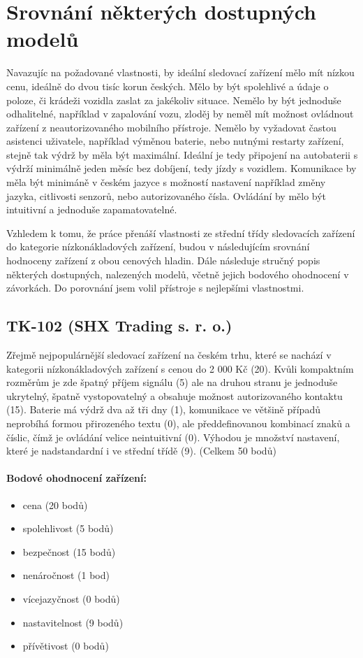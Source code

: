 \documentclass[FM,MP]{tulthesis}  %
\begin{document}
\section{Srovnání některých dostupných modelů}
Navazujíc na požadované vlastnosti, by ideální sledovací zařízení mělo mít nízkou cenu, ideálně do dvou tisíc korun českých. Mělo by být spolehlivé a údaje o poloze, či krádeži vozidla zaslat za jakékoliv situace. Nemělo by být jednoduše odhalitelné, například v zapalování vozu, zloděj by neměl mít možnost ovládnout zařízení z neautorizovaného mobilního přístroje. Nemělo by vyžadovat častou asistenci uživatele, například výměnou baterie, nebo nutnými restarty zařízení, stejně tak výdrž by měla být maximální. Ideální je tedy připojení na autobaterii s výdrží minimálně jeden měsíc bez dobíjení, tedy jízdy s vozidlem. Komunikace by měla být minimáně v českém jazyce s možností nastavení například změny jazyka, citlivosti senzorů, nebo autorizovaného čísla. Ovládání by mělo být intuitivní a jednoduše zapamatovatelné.

Vzhledem k tomu, že práce přenáší vlastnosti ze střední třídy sledovacích zařízení do kategorie nízkonákladových zařízení, budou v následujícím srovnání hodnoceny zařízení z obou cenových hladin. Dále následuje stručný popis některých dostupných, nalezených modelů, včetně jejich bodového ohodnocení v závorkách. Do porovnání jsem volil přístroje s nejlepšími vlastnostmi.

\subsection{TK-102 (SHX Trading s. r. o.)}
Zřejmě nejpopulárnější sledovací zařízení na českém trhu, které se nachází v kategorii nízkonákladových zařízení s cenou do 2 000 Kč (20). Kvůli kompaktním rozměrům je zde špatný příjem signálu (5) ale na druhou stranu je jednoduše ukrytelný, špatně vystopovatelný a obsahuje možnost autorizovaného kontaktu (15). Baterie má výdrž dva až tři dny (1), komunikace ve většině případů neprobíhá formou přirozeného textu (0), ale předdefinovanou kombinací znaků a číslic, čímž je ovládání velice neintuitivní (0). Výhodou je množství nastavení, které je nadstandardní i ve střední třídě (9). (Celkem 50 bodů)

\paragraph{Bodové ohodnocení zařízení:}
\begin{itemize}
\item cena (20 bodů)
\item spolehlivost (5 bodů)
\item bezpečnost (15 bodů)
\item nenáročnost (1 bod)
\item vícejazyčnost (0 bodů)
\item nastavitelnost (9 bodů)
\item přívětivost (0 bodů)
\end{itemize}
\end{document}
